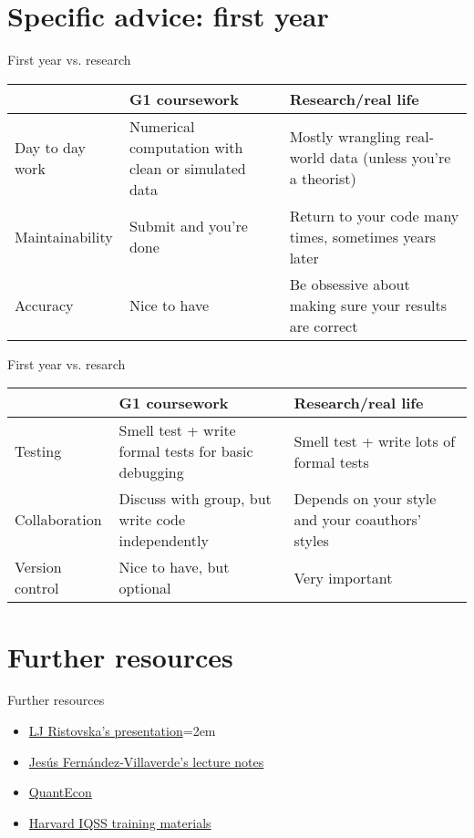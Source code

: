 \documentclass{beamer}
\begin{document}
\section{Specific advice: first year}

\begin{frame}{First year vs. research}
    \begin{tabular}{p{2.5cm}|p{3.5cm}|p{3.5cm}}
    & G1 coursework & Research/real life \\
    \hline
    Day to day work &
Numerical computation with clean or simulated data &
Mostly wrangling real-world data (unless you’re a theorist) \\
\hline
Maintainability &
Submit and you’re done &
Return to your code many times, sometimes years later \\
\hline
Accuracy &
Nice to have &
Be obsessive about making sure your results are correct \\
    \end{tabular}
\end{frame}

\begin{frame}{First year vs. resarch}
    \begin{tabular}{p{2cm}|p{4cm}|p{4cm}}
    & G1 coursework & Research/real life \\
    \hline
Testing &
Smell test + write formal tests for basic debugging &
Smell test + write lots of formal tests \\
\hline
Collaboration &
Discuss with group, but write code independently &
Depends on your style and your coauthors’ styles \\
\hline
Version control &
Nice to have, but optional &
Very important
    \end{tabular}
\end{frame}

\section{Further resources}
\begin{frame}{Further resources}
\begin{itemize}
    \item \href{https://scholar.harvard.edu/ristovska/resources}{LJ Ristovska's presentation}\itemsep=2em
    \item \href{https://www.sas.upenn.edu/~jesusfv/teaching.html}{Jesús Fernández-Villaverde's lecture notes}
    \item \href{https://quantecon.org/}{QuantEcon}
    \item \href{https://www.iq.harvard.edu/data-science-services/workshop-materials}{Harvard IQSS training materials}
\end{itemize}
\end{frame}
\end{document}
